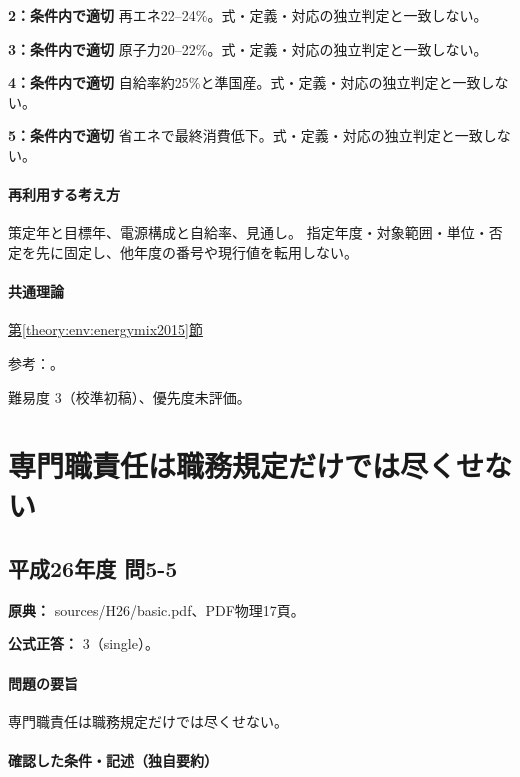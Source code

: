 \noindent\textbf{2：条件内で適切} 再エネ22–24\%。式・定義・対応の独立判定と一致しない。\par

\noindent\textbf{3：条件内で適切} 原子力20–22\%。式・定義・対応の独立判定と一致しない。\par

\noindent\textbf{4：条件内で適切} 自給率約25\%と準国産。式・定義・対応の独立判定と一致しない。\par

\noindent\textbf{5：条件内で適切} 省エネで最終消費低下。式・定義・対応の独立判定と一致しない。\par

\paragraph{再利用する考え方} 策定年と目標年、電源構成と自給率、見通し。 指定年度・対象範囲・単位・否定を先に固定し、他年度の番号や現行値を転用しない。

\paragraph{共通理論} \hyperref[theory:env:energymix2015]{第\ref*{theory:env:energymix2015}節}

\par 参考：\cite{env58_mix2015}。

\par 難易度 3（校準初稿）、優先度未評価。

\section{専門職責任は職務規定だけでは尽くせない}

\subsection{平成26年度 問5-5}
\label{q:h26-reg-basic-5-5}

\noindent\textbf{原典：} sources/H26/basic.pdf、PDF物理17頁。

\textbf{公式正答：} 3（single）。

\paragraph{問題の要旨} 専門職責任は職務規定だけでは尽くせない。

\paragraph{確認した条件・記述（独自要約）}\mbox{}\par

